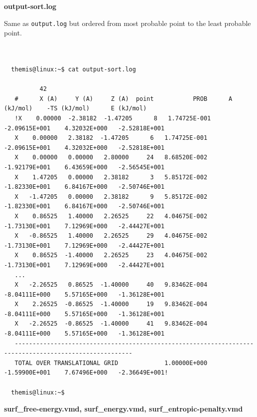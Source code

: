 \documentclass[10pt,a4paper]{report}
\begin{document}
\textbf{output-sort.log}

  Same as \texttt{output.log} but ordered from most probable point to the least 
  probable point. \\~ 

\begin{center}
  \begin{minipage}{0.90\textwidth}
    \begin{verbatim}

  themis@linux:~$ cat output-sort.log

          42
   #      X (A)     Y (A)     Z (A)  point           PROB      A (kJ/mol)    -TS (kJ/mol)      E (kJ/mol)
   !X    0.00000  -2.38182  -1.47205      8   1.74725E-001   -2.09615E+001    4.32032E+000   -2.52818E+001
   X    0.00000   2.38182  -1.47205      6   1.74725E-001   -2.09615E+001    4.32032E+000   -2.52818E+001
   X    0.00000   0.00000   2.80000     24   8.68520E-002   -1.92179E+001    6.43659E+000   -2.56545E+001
   X    1.47205   0.00000   2.38182      3   5.85172E-002   -1.82330E+001    6.84167E+000   -2.50746E+001
   X   -1.47205   0.00000   2.38182      9   5.85172E-002   -1.82330E+001    6.84167E+000   -2.50746E+001
   X    0.86525   1.40000   2.26525     22   4.04675E-002   -1.73130E+001    7.12969E+000   -2.44427E+001
   X   -0.86525   1.40000   2.26525     29   4.04675E-002   -1.73130E+001    7.12969E+000   -2.44427E+001
   X    0.86525  -1.40000   2.26525     23   4.04675E-002   -1.73130E+001    7.12969E+000   -2.44427E+001
   ...
   X   -2.26525   0.86525  -1.40000     40   9.83462E-004   -8.04111E+000    5.57165E+000   -1.36128E+001
   X    2.26525  -0.86525  -1.40000     19   9.83462E-004   -8.04111E+000    5.57165E+000   -1.36128E+001
   X   -2.26525  -0.86525  -1.40000     41   9.83462E-004   -8.04111E+000    5.57165E+000   -1.36128E+001
   -------------------------------------------------------------------------------------------------------
   TOTAL OVER TRANSLATIONAL GRID             1.00000E+000   -1.59900E+001    7.67496E+000   -2.36649E+001!

  themis@linux:~$ 

    \end{verbatim}
    \vskip0.25cm
  \end{minipage}%
\end{center}

\textbf{surf\_free-energy.vmd, surf\_energy.vmd, surf\_entropic-penalty.vmd} 
\end{document}

